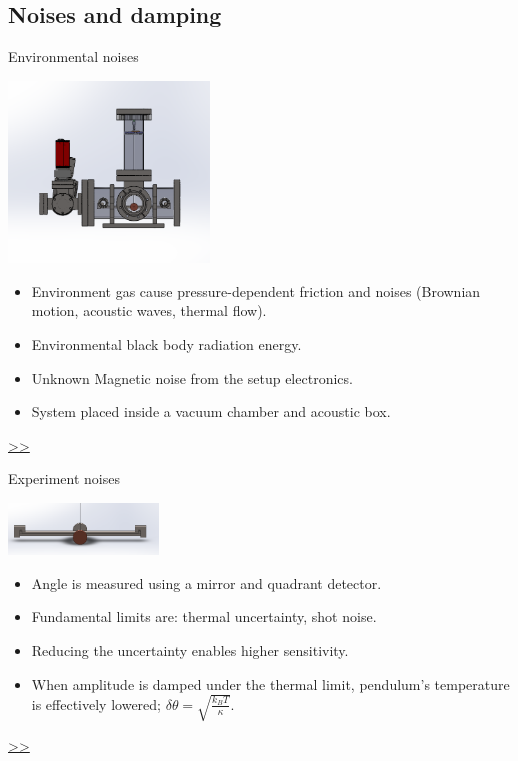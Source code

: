 \documentclass{beamer}
\begin{document}
\subsection{Noises and damping}
\begin{frame}{\hypertarget{frame:Environmental noises}{Environmental noises}}
	\begin{center}		
		\includegraphics[width=0.4\textwidth,keepaspectratio]{total_chamber.png}
    \end{center}
	\begin{itemize}
		
		\item Environment gas cause pressure-dependent friction and noises (Brownian motion, acoustic waves, thermal flow).  
		\item Environmental black body radiation energy.
		\item Unknown Magnetic noise from the setup electronics.
		\item System placed inside a vacuum chamber and acoustic box. 
			
	\end{itemize}
	\hyperlink{frame:Environmental noises 1}{>>} 
\end{frame}


\begin{frame}{\hypertarget{frame:Experiment noises}{Experiment noises}}
	\begin{center}		
		\includegraphics[width=0.3\textwidth,keepaspectratio]{pendulum_front.png}
    \end{center}
	\begin{itemize}
		
		\item Angle is measured using a mirror and quadrant detector.
		\item Fundamental limits are: thermal uncertainty, shot noise. 
		\item Reducing the uncertainty enables higher sensitivity.
		\item When amplitude is damped under the thermal limit, pendulum's temperature is effectively lowered; $\delta\theta = \sqrt{\frac{k_B T}{\kappa}}$. 
		
		
	\end{itemize}
	\hyperlink{frame:Experiment noises 1}{>>} 
\end{frame}
\end{document}
